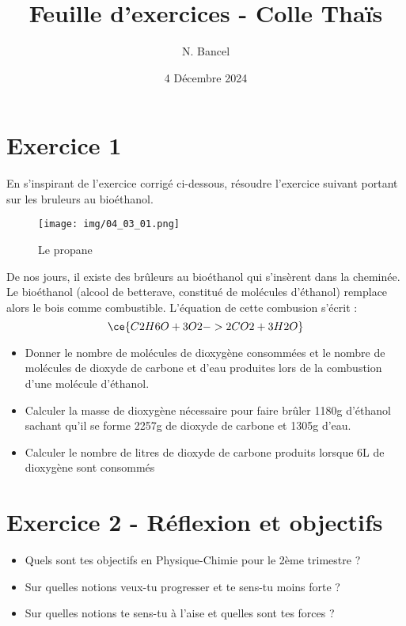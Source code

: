 \documentclass[a4paper,12pt]{article}
\begin{document}
\title{Feuille d'exercices - Colle Thaïs}
\author{N. Bancel}
\date{4 Décembre 2024}
\maketitle

\section{Exercice 1}

En s'inspirant de l'exercice corrigé ci-dessous, résoudre l'exercice suivant portant sur les bruleurs au bioéthanol.

\begin{figure}[H]
  \centering
  \texttt{[image: img/04\_03\_01.png]}
  \caption{\label{} Le propane}
\end{figure}

De nos jours, il existe des brûleurs au bioéthanol qui s'insèrent dans la cheminée. Le bioéthanol (alcool de betterave, constitué de molécules d'éthanol) remplace alors le bois comme combustible. L'équation de cette combusion s'écrit : 
\[
\ce{C2H6O + 3 O2 -> 2 CO2 + 3 H2O}
\]
\begin{itemize}[noitemsep]
  \item Donner le nombre de molécules de dioxygène consommées et le nombre de molécules de dioxyde de carbone et d'eau produites lors de la combustion d'une molécule d'éthanol.
  \item Calculer la masse de dioxygène nécessaire pour faire brûler 1180g d'éthanol sachant qu'il se forme 2257g de dioxyde de carbone et 1305g d'eau.
  \item Calculer le nombre de litres de dioxyde de carbone produits lorsque 6L de dioxygène sont consommés
\end{itemize}

\section{Exercice 2 - Réflexion et objectifs}

\begin{itemize}[noitemsep]
  \item Quels sont tes objectifs en Physique-Chimie pour le 2ème trimestre ?
  \item Sur quelles notions veux-tu progresser et te sens-tu moins forte ?
  \item Sur quelles notions te sens-tu à l'aise et quelles sont tes forces ?
\end{itemize}
\end{document}
